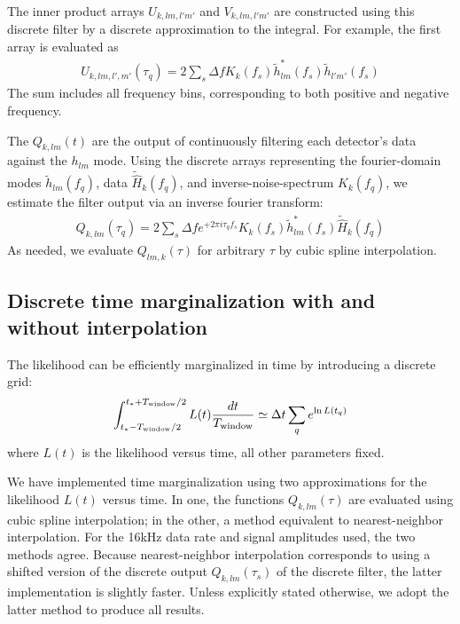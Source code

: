 \documentclass[twocolumn,prd,nofootinbib]{revtex4}
\begin{document}
The inner product arrays $U_{k,lm,l'm'}$ and $V_{k,lm,l'm'}$ are constructed using this discrete filter by a discrete
approximation to the integral.  For example, the first array is evaluated as
\begin{eqnarray}
U_{k,lm,l',m'}(\tau_q) = 2 \sum_s \Delta f  K_k(f_s) \tilde{h}_{lm}^*(f_s) \tilde{h}_{l'm'}(f_s)
\end{eqnarray}
The sum includes all frequency bins, corresponding to both positive and negative frequency.  %


The $Q_{k,lm}(t)$ are the output of continuously filtering each detector's data against the $h_{lm}$ mode.  Using the
discrete arrays representing the fourier-domain modes $\tilde{h}_{lm}(f_q)$, data $\tilde{\hat{H}}_k(f_q)$, and inverse-noise-spectrum  $K_k(f_q)$, we estimate the
filter output via an inverse fourier transform:
\begin{eqnarray}
Q_{k,lm}(\tau_q) = 2 \sum_s \Delta f e^{+2\pi i \tau_q f_s} K_k(f_s) \tilde{h}^*_{lm}(f_s) \tilde{\hat{H}}_k(f_q)
\end{eqnarray}
%
As needed, we evaluate $Q_{lm,k}(\tau)$ for arbitrary $\tau$ by  cubic spline interpolation.  




\subsection{Discrete time marginalization with and without interpolation}

The likelihood can be efficiently marginalized in time by introducing a discrete grid:
\begin{eqnarray}
\int_{t_*-T_{\rm window}/2 }^{t_*+T_{\rm window}/2}L(t) \frac{dt}{T_{\rm window}} \simeq \Delta t \sum_q e^{\ln L(t_q)}
\end{eqnarray}
where $L(t) $ is the likelihood versus time, all other parameters fixed.   
%

We have implemented time marginalization using two approximations for the likelihood $L(t)$ versus time.  In one,  the  functions
$Q_{k,lm}(\tau)$ are evaluated using cubic spline interpolation; in the other, a method equivalent to nearest-neighbor interpolation.  For
the 16kHz data rate and signal amplitudes used, the two methods agree.   Because nearest-neighbor interpolation
corresponds to using a shifted version of the  discrete output $Q_{k,lm}(\tau_s)$ of the discrete filter, the latter
implementation is slightly faster.   
%
Unless explicitly stated otherwise, we adopt the latter method to produce all results.  
\end{document}
